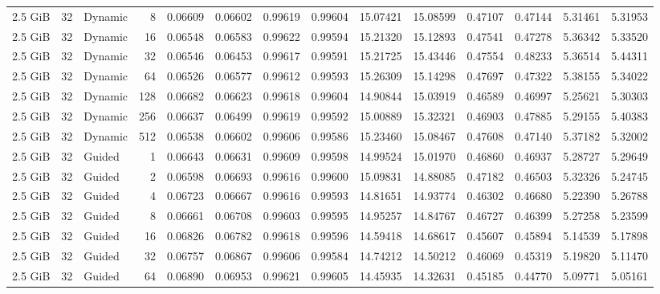 \begin{table}[H]
\begin{adjustbox}{width=\textwidth, keepaspectratio}
\begin{tabular}{rrlrrrrrrrrrrr}
                    2.5 GiB & 32 & Dynamic & 8 & 0.06609 & 0.06602 & 0.99619 & 0.99604 & 15.07421 & 15.08599 & 0.47107 & 0.47144 & 5.31461 & 5.31953 \\
                    2.5 GiB & 32 & Dynamic & 16 & 0.06548 & 0.06583 & 0.99622 & 0.99594 & 15.21320 & 15.12893 & 0.47541 & 0.47278 & 5.36342 & 5.33520 \\
                    2.5 GiB & 32 & Dynamic & 32 & 0.06546 & 0.06453 & 0.99617 & 0.99591 & 15.21725 & 15.43446 & 0.47554 & 0.48233 & 5.36514 & 5.44311 \\
                    2.5 GiB & 32 & Dynamic & 64 & 0.06526 & 0.06577 & 0.99612 & 0.99593 & 15.26309 & 15.14298 & 0.47697 & 0.47322 & 5.38155 & 5.34022 \\
                    2.5 GiB & 32 & Dynamic & 128 & 0.06682 & 0.06623 & 0.99618 & 0.99604 & 14.90844 & 15.03919 & 0.46589 & 0.46997 & 5.25621 & 5.30303 \\
                    2.5 GiB & 32 & Dynamic & 256 & 0.06637 & 0.06499 & 0.99619 & 0.99592 & 15.00889 & 15.32321 & 0.46903 & 0.47885 & 5.29155 & 5.40383 \\
                    2.5 GiB & 32 & Dynamic & 512 & 0.06538 & 0.06602 & 0.99606 & 0.99586 & 15.23460 & 15.08467 & 0.47608 & 0.47140 & 5.37182 & 5.32002 \\
                    2.5 GiB & 32 & Guided & 1 & 0.06643 & 0.06631 & 0.99609 & 0.99598 & 14.99524 & 15.01970 & 0.46860 & 0.46937 & 5.28727 & 5.29649 \\
                    2.5 GiB & 32 & Guided & 2 & 0.06598 & 0.06693 & 0.99616 & 0.99600 & 15.09831 & 14.88085 & 0.47182 & 0.46503 & 5.32326 & 5.24745 \\
                    2.5 GiB & 32 & Guided & 4 & 0.06723 & 0.06667 & 0.99616 & 0.99593 & 14.81651 & 14.93774 & 0.46302 & 0.46680 & 5.22390 & 5.26788 \\
                    2.5 GiB & 32 & Guided & 8 & 0.06661 & 0.06708 & 0.99603 & 0.99595 & 14.95257 & 14.84767 & 0.46727 & 0.46399 & 5.27258 & 5.23599 \\
                    2.5 GiB & 32 & Guided & 16 & 0.06826 & 0.06782 & 0.99618 & 0.99596 & 14.59418 & 14.68617 & 0.45607 & 0.45894 & 5.14539 & 5.17898 \\
                    2.5 GiB & 32 & Guided & 32 & 0.06757 & 0.06867 & 0.99606 & 0.99584 & 14.74212 & 14.50212 & 0.46069 & 0.45319 & 5.19820 & 5.11470 \\
                    2.5 GiB & 32 & Guided & 64 & 0.06890 & 0.06953 & 0.99621 & 0.99605 & 14.45935 & 14.32631 & 0.45185 & 0.44770 & 5.09771 & 5.05161 \\

\end{tabular}
\end{adjustbox}
\end{table}
